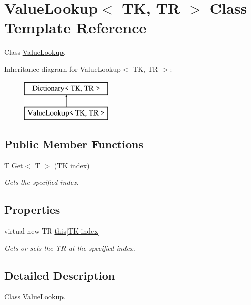 \hypertarget{class_value_lookup}{}\section{Value\+Lookup$<$ TK, TR $>$ Class Template Reference}
\label{class_value_lookup}


Class \hyperlink{class_value_lookup}{Value\+Lookup}.  


Inheritance diagram for Value\+Lookup$<$ TK, TR $>$\+:\begin{figure}[H]
\begin{center}
\leavevmode
\includegraphics[height=2.000000cm]{class_value_lookup}
\end{center}
\end{figure}
\subsection*{Public Member Functions}
\begin{DoxyCompactItemize}
\item 
T \hyperlink{class_value_lookup_a14914a625a7b67b09a3a1fc19d81e95c}{Get$<$ T $>$} (TK index)
\begin{DoxyCompactList}\small\item\em Gets the specified index. \end{DoxyCompactList}\end{DoxyCompactItemize}
\subsection*{Properties}
\begin{DoxyCompactItemize}
\item 
virtual new TR \hyperlink{class_value_lookup_ab97673769de1de0b42b7f7afa235981f}{this\mbox{[}\+T\+K index\mbox{]}}
\begin{DoxyCompactList}\small\item\em Gets or sets the TR at the specified index. \end{DoxyCompactList}\end{DoxyCompactItemize}


\subsection{Detailed Description}
Class \hyperlink{class_value_lookup}{Value\+Lookup}. 


